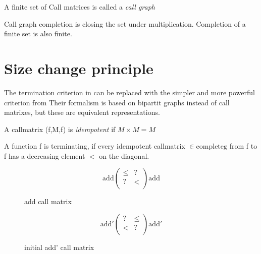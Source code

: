 \begin{definition}
A finite set of Call matrices is called a \emph{call graph}
\end{definition}

\begin{definition}
Call graph completion is closing the set under multiplication.
Completion of a finite set is also finite. 
\end{definition}

\section{Size change principle}

The termination criterion in \cite{abelAltenkirch:predStRec} can be replaced with the
simpler and more powerful criterion from \cite{lee01sizechange}
Their formalism is based on bipartit graphs instead of call matrixes, but these are
equivalent representations.

\begin{definition}
A callmatrix (f,M,f) is \emph{idempotent} if $ M \times M = M $ 
\end{definition}

\begin{definition}
A function f is terminating, if every idempotent callmatrix  $ \in \mathrm{complete g} $ from f to f has a decreasing element $<$ on
the diagonal.
\end{definition}

\begin{figure}[p]
\[
\mathrm{add}\begin{pmatrix}

\leq & ? \\
?    & < \\

\end{pmatrix}\mathrm{add}
\]
\caption{add call matrix}
\end{figure}

\begin{figure}[p]

\[
\mathrm{add'} \begin{pmatrix}

? & \leq \\
< & ?   \\

\end{pmatrix} \mathrm{add'}
\]

\caption{initial add' call matrix}

\end{figure}


